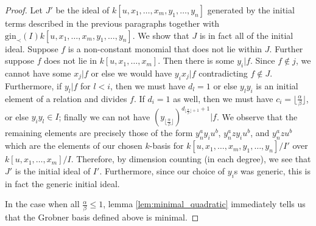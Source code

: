 \documentclass{amsart}
\theoremstyle{plain}
\theoremstyle{definition}
\theoremstyle{remark}
\numberwithin{equation}{section}
\newcommand \gin{\text{gin}}
\begin{document}
\begin{proof}
Let $J'$ be the ideal of $k[u, x_1, \ldots, x_m, y_1, \ldots, y_n]$ generated by the initial 
terms described in the previous paragraphs together with $\gin_\prec(I)k[u, x_1, \ldots, 
x_m, y_1, \ldots, y_n]$.  We show that $J$ is in fact all of the initial ideal.  Suppose $f$ is a 
non-constant monomial that does not lie within $J$.  Further suppose $f$ does not lie in 
$k[u, x_1, \ldots, x_m]$.  Then there is some $y_i|f$.  Since $f\not\in j$, we cannot have 
some $x_j|f$ or else we would have $y_ix_j|f$ contradicting $f\not\in J$.  Furthermore, if 
$y_l|f$ for $l<i$, then we must have $d_l=1$ or else $y_ly_i$ is an initial element of a 
relation and divides $f$.  If $d_i=1$ as well, then we must have $c_i=\lfloor \frac{\alpha}
{\beta}\rfloor$, or else $y_iy_l\in I$; finally we can not have $(y_{\lfloor \frac{\alpha}{\beta}
\rfloor})^{d_{\lfloor \frac{\alpha}{\beta} \rfloor+1}+1}|f$.  We observe that the remaining 
elements are precisely those of the form $y_n^a y_i u^b$, $y_n^a zy_iu^b$, and $y_n^a z 
u^b$ which are the elements of our chosen $k$-basis for $k[u, x_1, \ldots, x_m, y_1, \ldots, 
y_n]/I'$ over $k[u, x_1, \ldots, x_m]/I$.  Therefore, by dimension counting (in each degree), 
we see that $J'$ is the initial ideal of $I'$.  Furthermore, since our choice of $y_i$s was 
generic, this is in fact the generic initial ideal.

In the case when all $\frac{\alpha}{\beta}\le 1$, lemma \ref{lem:minimal_quadratic} immediately tells us that the Grobner basis defined above is minimal.
\end{proof}
\end{document}
